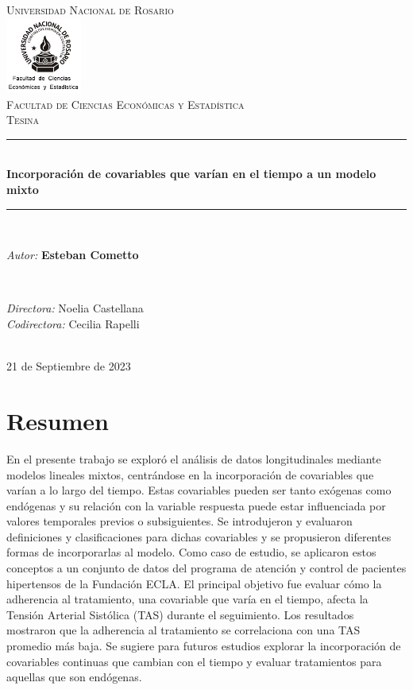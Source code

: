 \documentclass[spanish]{article}
\title{\thesistitle}
\author{\thesisauthorfirst\space\thesisauthorsecond}
\date{\thesisdate}
\numberwithin{figure}{subsection}
\numberwithin{equation}{subsection}
\numberwithin{table}{subsection}
\def\thesistitle{Incorporación de covariables que varían en el tiempo a un modelo mixto}
\def\thesisauthorfirst{\textbf{Esteban Cometto}}
\def\thesissupervisorfirst{Noelia Castellana}
\def\thesissupervisorsecond{Cecilia Rapelli}
\begin{document}
\begin{titlepage}
    \newcommand{\HRule}{\rule{\linewidth}{0.5mm}}
	\center
	\textsc{\Large Universidad Nacional de Rosario}\\[.7cm]
	\includegraphics[width=25mm]{img/fceye-unr.png}\\[.5cm]
	\textsc{Facultad de Ciencias Económicas y Estadística}\\[0.5cm]
	\textsc{Tesina}
	
	\HRule \\[0.4cm]
	{ \huge \bfseries \thesistitle}\\[0.1cm]
	\HRule \\[.5cm]
	
	\begin{minipage}{0.6\textwidth}
	\large
	\textit{Autor:}	\thesisauthorfirst
	\end{minipage}
	\\[.6cm]
	\begin{minipage}{0.6\textwidth}
	\textit{Directora:} 	\thesissupervisorfirst \\[.2cm]
	\textit{Codirectora:} 	\thesissupervisorsecond
	\end{minipage}
	\\[4cm]
	\vfill
	{\large 21 de Septiembre de 2023}\\
	\clearpage
\end{titlepage}

\newpage
\section*{Resumen}

En el presente trabajo se exploró el análisis de datos longitudinales mediante
modelos lineales mixtos, centrándose en la incorporación de covariables que
varían a lo largo del tiempo. Estas covariables pueden ser tanto exógenas como
endógenas y su relación con la variable respuesta puede estar influenciada por
valores temporales previos o subsiguientes. Se introdujeron y evaluaron
definiciones y clasificaciones para dichas covariables y se propusieron
diferentes formas de incorporarlas al modelo. Como caso de estudio, se aplicaron
estos conceptos a un conjunto de datos del programa de atención y control de
pacientes hipertensos de la Fundación ECLA. El principal objetivo fue evaluar
cómo la adherencia al tratamiento, una covariable que varía en el tiempo, afecta
la Tensión Arterial Sistólica (TAS) durante el seguimiento. Los resultados
mostraron que la adherencia al tratamiento se correlaciona con una TAS promedio
más baja. Se sugiere para futuros estudios explorar la incorporación de
covariables continuas que cambian con el tiempo y evaluar tratamientos para
aquellas que son endógenas.
\end{document}
